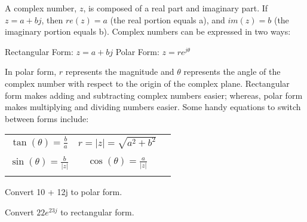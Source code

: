 \pgfplotsset{width=7cm,compat=1.16}


A complex number, $z$, is composed of a real part and imaginary part.
If $z = a + bj$, then $re(z) = a$ (the real portion equals a), and $im(z) = b$ (the imaginary portion equals b).
Complex numbers can be expressed in two ways:

\begin{center}
Rectangular Form: $z = a + bj$ \hspace{1em} Polar Form: $z = re^{j\theta}$
\end{center}

In polar form, $r$ represents the magnitude and $\theta$ represents the angle of the complex number with respect to the origin of the complex plane.
Rectangular form makes adding and subtracting complex numbers easier; whereas, polar form makes multiplying and dividing numbers easier.
Some handy equations to switch between forms include:

\begin{center}

\begin{tabular}{ c c c }
 $\tan(\theta) = \frac{b}{a}$ & $r = |z| = \sqrt{a^2 + b^2}$ \\ \\
 $\sin(\theta) = \frac{b}{|z|}$ & $\cos(\theta) = \frac{a}{|z|}$ \\  \\
\end{tabular}

\end{center}

\begin{enumerate}

\qitem Convert 10 + 12j to polar form.

\end{enumerate}

\begin{enumerate}

\qitem Convert $22e^{23j}$ to rectangular form.

\end{enumerate}


